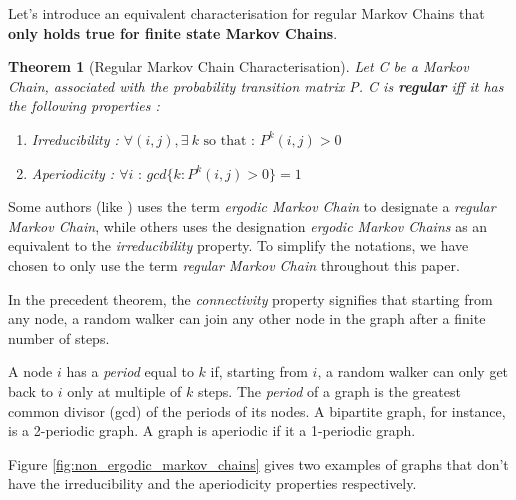 \documentclass[sn-mathphys]{sn-jnl}%
\theoremstyle{thmstyleone}%
\newtheorem{theo}{Theorem}[section]
\theoremstyle{thmstyletwo}%
\theoremstyle{thmstylethree}%
\begin{document}
Let's introduce an equivalent characterisation for regular Markov
Chains that \textbf{only holds true for finite state Markov Chains}.

\begin{theo}[Regular Markov Chain Characterisation]
Let C be a Markov Chain, associated with the probability transition matrix P. C is \textbf{regular} iff it has the following properties :
\begin{enumerate}
    \item Irreducibility : $\forall (i, j), \exists \ k \mbox{ so that : } P^k(i,j)>0$
    \item Aperiodicity : $\forall i \mbox{ : } gcd\{k: P^k(i,j)>0\} = 1$
\end{enumerate}

\end{theo}

\label{ergodic_regular_markov}

Some authors (like \cite{sevi2019}) uses the term \textit{ergodic
  Markov Chain} to designate a \textit{regular Markov Chain}, while
others \cite{grinstead_snell_2006} uses the designation
\textit{ergodic Markov Chains} as an equivalent to the
\textit{irreducibility} property. To simplify the notations, we have
chosen to only use the term \textit{regular Markov Chain} throughout
this paper.

In the precedent theorem, the \textit{connectivity} property signifies
that starting from any node, a random walker can join any other node
in the graph after a finite number of steps.

A node $i$ has a \textit{period} equal to $k$ if, starting from $i$, a
random walker can only get back to $i$ only at multiple of $k$
steps. The \textit{period} of a graph is the greatest common divisor
(gcd) of the periods of its nodes. A bipartite graph, for instance, is
a 2-periodic graph. A graph is aperiodic if it a 1-periodic graph.

Figure \ref{fig:non_ergodic_markov_chains} gives two examples of
graphs that don't have the irreducibility and the aperiodicity
properties respectively.
\end{document}
